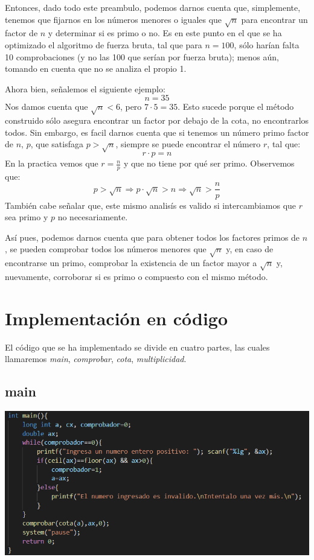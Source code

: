 \documentclass[12pt]{article}
\begin{document}
Entonces, dado todo este preambulo, podemos darnos cuenta que, simplemente, tenemos que fijarnos en los n\'umeros menores o iguales que $\sqrt{n}$ para encontrar un factor de $n$ y determinar si es primo o no. Es en este punto en el que se ha optimizado el algoritmo de fuerza bruta, tal que para $n=100$, s\'olo har\'{i}an falta 10 comprobaciones (y no las 100 que ser\'{i}an por fuerza bruta); menos a\'un, tomando en cuenta que no se analiza el propio 1.

Ahora bien, señalemos el siguiente ejemplo:
$$n=35$$
Nos damos cuenta que $\sqrt{n}<6$, pero $7\cdot 5=35$. Esto sucede porque el m\'etodo construido s\'olo asegura encontrar un factor por debajo de la cota, no encontrarlos todos. Sin embargo, es facil darnos cuenta que si tenemos un n\'umero primo factor de $n$, $p$, que satisfaga $p>\sqrt{n}$, siempre se puede encontrar el n\'umero $r$, tal que:
$$r\cdot p = n$$
En la practica vemos que $r=\frac{n}{p}$ y que no tiene por qu\'e ser primo. Observemos que:
$$p>\sqrt{n}\Longrightarrow p\cdot\sqrt{n}>n\Longrightarrow \sqrt{n}>\frac{n}{p}$$
Tambi\'en cabe señalar que, este mismo analis\'{i}s es valido si intercambiamos que $r$ sea primo y $p$ no necesariamente.

As\'i pues, podemos darnos cuenta que para obtener todos los factores primos de $n$, se pueden comprobar todos los n\'umeros menores que $\sqrt{n}$ y, en caso de encontrarse un primo, comprobar la existencia de un factor mayor a $\sqrt{n}$ y, nuevamente, corroborar si es primo o compuesto con el mismo m\'etodo.

\section{Implementaci\'on en c\'odigo}

El c\'odigo que se ha implementado se divide en cuatro partes, las cuales llamaremos \textit{main}, \textit{comprobar}, \textit{cota}, \textit{multiplicidad}.

\subsection{main}
\begin{center}
 \includegraphics[scale=0.9]{main}
\end{center}
\end{document}
